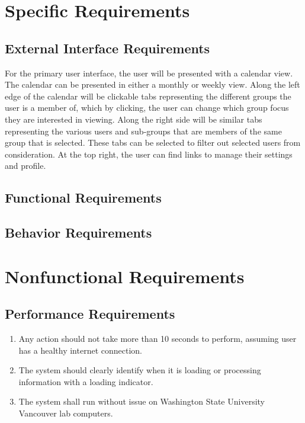 \documentclass{scrreprt}
\begin{document}
\chapter{Specific Requirements}

\section{External Interface Requirements}
For the primary user interface, the user will be presented with a calendar view.
The calendar can be presented in either a monthly or weekly view. Along the left
edge of the calendar will be clickable tabs representing the different groups
the user is a member of, which by clicking, the user can change which group
focus they are interested in viewing. Along the right side will be similar tabs
representing the various users and sub-groups that are members of the same
group that is selected. These tabs can be selected to filter out selected users
from consideration. At the top right, the user can find links to manage their
settings and profile.
\section{Functional Requirements}

\section{Behavior Requirements}


\chapter{Nonfunctional Requirements}

\section{Performance Requirements}
\begin{enumerate}
\item Any action should not take more than 10 seconds to perform, assuming user
has a healthy internet connection.
\item The system should clearly identify when it is loading or processing
information with a loading indicator.
\item The system shall run without issue on Washington State University Vancouver
lab computers.
\end{enumerate}
\end{document}
